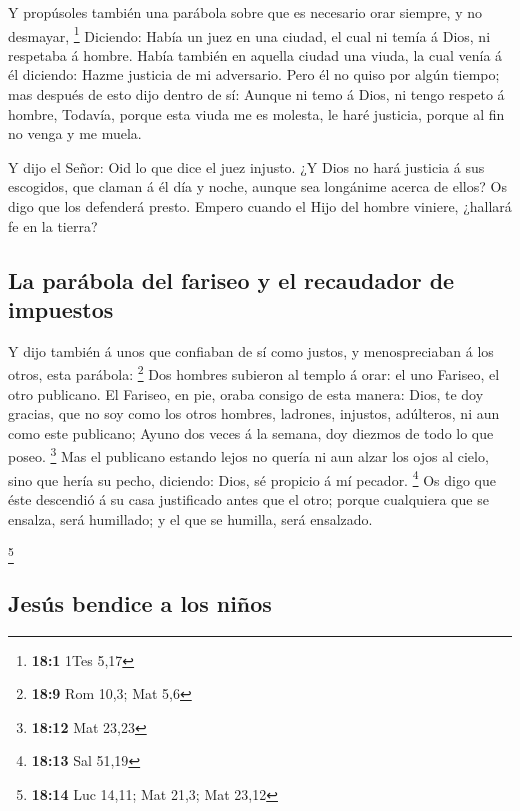  Y propúsoles también una parábola sobre que es necesario
orar siempre, y no desmayar, \footnote{\textbf{18:1} 1Tes 5,17}
 Diciendo: Había un juez en una ciudad, el cual ni temía á
Dios, ni respetaba á hombre.  Había también en aquella
ciudad una viuda, la cual venía á él diciendo: Hazme justicia de mi
adversario.  Pero él no quiso por algún tiempo; mas después
de esto dijo dentro de sí: Aunque ni temo á Dios, ni tengo respeto á
hombre,  Todavía, porque esta viuda me es molesta, le haré
justicia, porque al fin no venga y me muela.

 Y dijo el Señor: Oid lo que dice el juez injusto.
 ¿Y Dios no hará justicia á sus escogidos, que claman á él
día y noche, aunque sea longánime acerca de ellos?  Os digo
que los defenderá presto. Empero cuando el Hijo del hombre viniere,
¿hallará fe en la tierra?

\hypertarget{la-paruxe1bola-del-fariseo-y-el-recaudador-de-impuestos}{%
\subsection{La parábola del fariseo y el recaudador de
impuestos}\label{la-paruxe1bola-del-fariseo-y-el-recaudador-de-impuestos}}

 Y dijo también á unos que confiaban de sí como justos, y
menospreciaban á los otros, esta parábola: \footnote{\textbf{18:9} Rom
  10,3; Mat 5,6}  Dos hombres subieron al templo á orar: el
uno Fariseo, el otro publicano.  El Fariseo, en pie, oraba
consigo de esta manera: Dios, te doy gracias, que no soy como los otros
hombres, ladrones, injustos, adúlteros, ni aun como este publicano;
 Ayuno dos veces á la semana, doy diezmos de todo lo que
poseo. \footnote{\textbf{18:12} Mat 23,23}  Mas el
publicano estando lejos no quería ni aun alzar los ojos al cielo, sino
que hería su pecho, diciendo: Dios, sé propicio á mí pecador.
\footnote{\textbf{18:13} Sal 51,19}  Os digo que éste
descendió á su casa justificado antes que el otro; porque cualquiera que
se ensalza, será humillado; y el que se humilla, será ensalzado.

\footnote{\textbf{18:14} Luc 14,11; Mat 21,3; Mat 23,12}

\hypertarget{jesuxfas-bendice-a-los-niuxf1os}{%
\subsection{Jesús bendice a los
niños}\label{jesuxfas-bendice-a-los-niuxf1os}}

